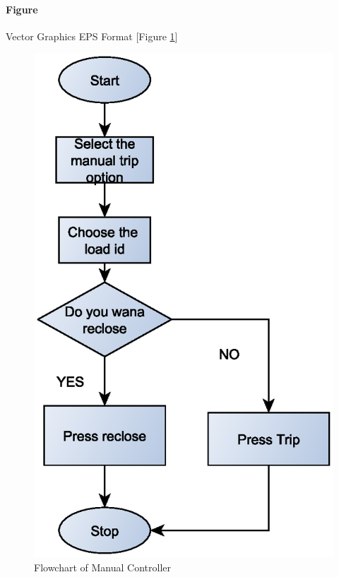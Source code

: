 \paragraph*{Figure} Vector Graphics EPS Format [Figure \ref{fig:fcmc1}]
\begin{figure}[H]
	\begin{center}
		\includegraphics[scale=0.5]{Figures/manualtrip.eps}
		\caption{Flowchart of Manual Controller}
		\label{fig:fcmc1}
	\end{center}
\end{figure}


